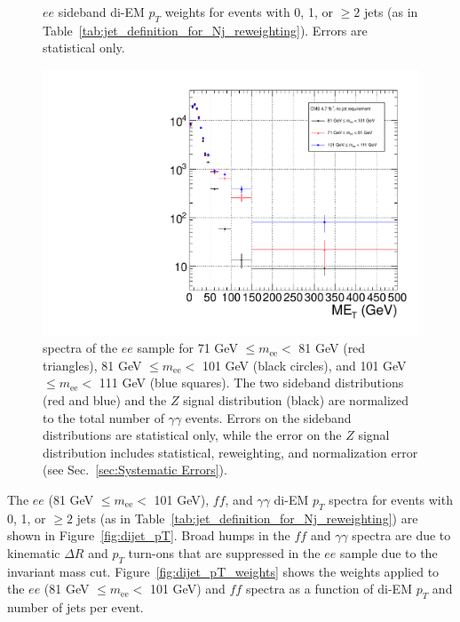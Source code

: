 \documentclass[dissertation.tex]{subfiles}
\begin{document}
\begin{figure}
	\caption{$ee$ sideband di-EM $p_{T}$ weights for events with 0, 1, or $\geq 2$ jets (as in Table~\ref{tab:jet_definition_for_Nj_reweighting}).  Errors are statistical only.}
	\label{fig:ee_sideband_dijet_pT_spectra}
\end{figure}

\begin{figure}
	\centering
	\includegraphics[scale=0.3]{all_ee_MET_spectra}
	\caption{\MET spectra of the $ee$ sample for 71 GeV $\leq m_{\mathrm{ee}} <$ 81 GeV (red triangles), 81 GeV $\leq m_{\mathrm{ee}} <$ 101 GeV (black circles), and 101 GeV $\leq m_{\mathrm{ee}} <$ 111 GeV (blue squares).  The two sideband distributions (red and blue) and the  $Z$ signal distribution (black) are normalized to the total number of $\gamma\gamma$ events.  Errors on the sideband distributions are statistical only, while the error on the $Z$ signal distribution includes statistical, reweighting, and normalization error (see Sec.~\ref{sec:Systematic Errors}).}
	\label{fig:all_ee_MET_spectra}
\end{figure}

The $ee$ (81 GeV $\leq m_{\mathrm{ee}} <$ 101 GeV), $\mathit{ff}$, and $\gamma\gamma$ di-EM $p_{T}$ spectra for events with 0, 1, or $\geq 2$ jets (as in Table~\ref{tab:jet_definition_for_Nj_reweighting}) are shown in Figure~\ref{fig:dijet_pT}.  Broad humps in the $\mathit{ff}$ and $\gamma\gamma$ spectra are due to kinematic $\Delta R$ and $p_{T}$ turn-ons that are suppressed in the $ee$ sample due to the invariant mass cut.  Figure~\ref{fig:dijet_pT_weights} shows the weights applied to the $ee$ (81 GeV $\leq m_{\mathrm{ee}} <$ 101 GeV) and $\mathit{ff}$ \MET spectra as a function of di-EM $p_{T}$ and number of jets per event.
\end{document}
